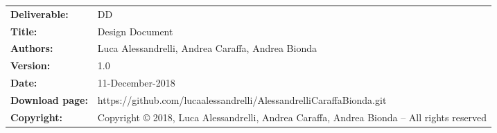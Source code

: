 \begin{table}[h!]
\begin{tabu} to \textwidth { X[0.3,r,p] X[0.7,l,p] }
\hline

\textbf{Deliverable:} & DD\\
\textbf{Title:} & Design Document \\
\textbf{Authors:} & Luca Alessandrelli, Andrea Caraffa, Andrea Bionda \\
\textbf{Version:} & 1.0 \\ 
\textbf{Date:} & 11-December-2018 \\
\textbf{Download page:} & https://github.com/lucaalessandrelli/AlessandrelliCaraffaBionda.git \\
\textbf{Copyright:} & Copyright © 2018, Luca Alessandrelli, Andrea Caraffa, Andrea Bionda – All rights reserved \\
\hline
\end{tabu}
\end{table}




\setcounter{page}{2}


\newpage
{}
\tableofcontents
\newpage
{}
\listoffigures
{}
\listoftables

\clearpage
{}
\label{sect:introduction}


\clearpage
{}
\label{sect:architecturaldesign}


\clearpage
{}
\label{sect:uidesign}


